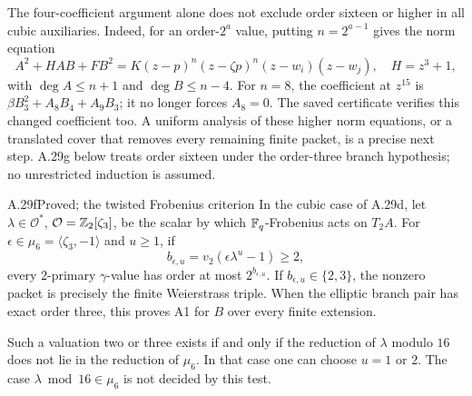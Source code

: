 The four-coefficient argument alone does not exclude order sixteen
or higher in all cubic auxiliaries. Indeed, for
an order-$2^a$ value, putting $n=2^{a-1}$ gives
the norm equation
\[
 A^2+HAB+FB^2
   =K(z-p)^n(z-\zeta p)^n(z-w_i)(z-w_j),
 \quad H=z^3+1,
\]
with $\deg A\le n+1$ and $\deg B\le n-4$.
For $n=8$, the coefficient at $z^{15}$ is
$\beta B_3^2+A_8B_4+A_9B_3$; it no longer
forces $A_8=0$. The saved certificate verifies
this changed coefficient too. A uniform analysis
of these higher norm equations, or a translated
cover that removes every remaining finite packet,
is a precise next step. A.29g below treats order sixteen
under the order-three branch hypothesis; no unrestricted induction
is assumed.

\begin{claim}{A.29f}{Proved; the twisted Frobenius criterion}
In the cubic case of A.29d, let $\lambda\in\mathcal O^*$,
$\mathcal O=\mathbb Z_2[\zeta_3]$, be the scalar by which
$\mathbb F_q$-Frobenius acts on $T_2A$. For
$\epsilon\in\mu_6=\langle\zeta_3,-1\rangle$ and $u\ge1$,
if
\[
 b_{\epsilon,u}=v_2(\epsilon\lambda^u-1)\ge2,
\]
every $2$-primary $\gamma$-value has order at most
$2^{b_{\epsilon,u}}$. If $b_{\epsilon,u}\in\{2,3\}$,
the nonzero packet is precisely the finite Weierstrass
triple. When the elliptic branch pair has exact order
three, this proves A1 for $B$ over every finite extension.

Such a valuation two or three exists if and only if
the reduction of $\lambda$ modulo $16$ does not lie
in the reduction of $\mu_6$. In that case one can
choose $u=1$ or $2$. The case
$\lambda\bmod16\in\mu_6$ is not decided by this test.
\end{claim}
